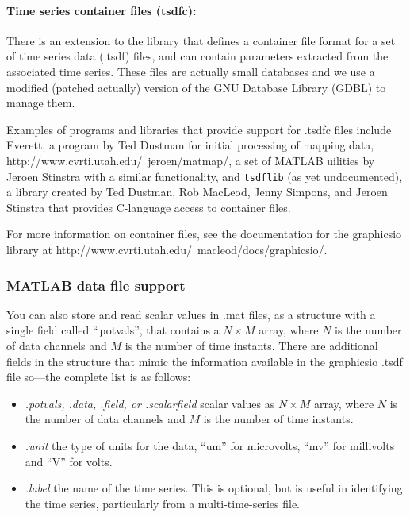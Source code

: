 \paragraph{Time series container files (tsdfc): } 
\label{sec:tsdfcfile}

There is an extension to the \graphicsio{} library that defines a container
file format for a set of time series data (.tsdf) files, and
can contain parameters extracted from the associated time series.  These
files are actually small databases and we use a modified (patched actually)
version of the GNU Database Library (GDBL) to manage them.  

Examples of programs and libraries that provide support for .tsdfc
files include Everett, a program by Ted Dustman for initial processing of
mapping data,  
{http://www.cvrti.utah.edu/~jeroen/matmap/}, a set of MATLAB uilities by
Jeroen Stinstra with a similar functionality, and \texttt{tsdflib} (as yet
undocumented), a library created by Ted Dustman, Rob MacLeod, Jenny
Simpons, and Jeroen Stinstra that provides C-language access to container
files.

For more information on container files, see the documentation for the
graphicsio library at
{http://www.cvrti.utah.edu/~macleod/docs/graphicsio/}. 

\subsubsection{MATLAB data file support}
\label{sec:matlabdata}

You can also store and read scalar values in .mat files, as a structure
with a single field called ``.potvals'', that contains a $N \times M$ array,
where $N$ is the number of data channels and $M$ is the number of time
instants.  There are additional fields in the structure that mimic the
information available in the graphicsio .tsdf file so---the complete list is
as follows:
%
\begin{itemize}
  \item \emph{.potvals, .data, .field, or .scalarfield} scalar values as $N
    \times M$ array, where $N$ is the number of data channels and $M$ is
    the number of time instants.
  \item \emph{.unit} the type of units for the data, ``um'' for microvolts,
  ``mv'' for millivolts and ``V'' for volts.
  \item \emph{.label} the name of the time series.  This is optional, but is
    useful in identifying the time series, particularly from a 
    multi-time-series file.
\end{itemize}

